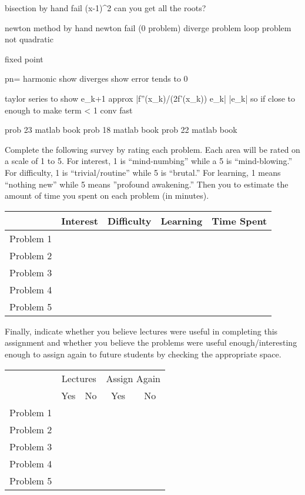 \documentclass[11pt,letterpaper]{article}
\begin{document}
\problem{} 
bisection by hand
fail (x-1)^2
can you get all the roots?


\problem{}
newton method by hand
newton fail
(0 problem)
diverge problem
loop problem
not quadratic

\problem{} 
fixed point


pn= harmonic
show diverges 
show error tends to 0

taylor series to show
e_{k+1} approx |f''(x_k)/(2f'(x_k)) e_k| |e_k|
so if close to enough to make term < 1 conv fast

prob 23 matlab book
prob 18 matlab book
prob 22 matlab book

\newpage



 \pvspace{0.3cm}

Complete the following survey by rating each problem. Each area will be rated on a scale of 1 to 5. For interest, 1 is ``mind-numbing'' while a 5 is ``mind-blowing.'' For difficulty, 1 is ``trivial/routine'' while 5 is ``brutal.'' For learning, 1 means ``nothing new'' while 5 means ''profound awakening.'' Then you to estimate the amount of time you spent on each problem (in minutes). 

\vspace{0.25cm}
\begin{center}
\begin{tabular}{c||c|c|c|c|}
 & Interest & Difficulty & Learning & Time Spent \\ \hline \hline
Problem 1 &  &  &  &  \\ \hline
Problem 2 &  &  &  &  \\ \hline
Problem 3 &  &  &  &  \\ \hline
Problem 4 &  &  &  &  \\ \hline
Problem 5 &  &  &  &  \\ \hline
\end{tabular}
\end{center}
\vspace{0.25cm}

Finally, indicate whether you believe lectures were useful in completing this assignment and whether you believe the problems were useful enough/interesting enough to assign again to future students by checking the appropriate space.

\vspace{0.25cm}
\begin{center}
\begin{tabular}{c||c|c|c|c|}
  & \multicolumn{2}{c|}{Lectures} &  \multicolumn{2}{c|}{Assign Again} \\ \cline{2-5}
   & Yes & No & Yes & No \\ \hline \hline
  Problem 1 &  &  &  &  \\ \hline 
  Problem 2 &  &  &  &  \\ \hline 
  Problem 3 &  &  &  &  \\ \hline 
  Problem 4 &  &  &  &  \\ \hline 
  Problem 5 &  &  &  &  \\ \hline 
\end{tabular}
\end{center}
\end{document}
